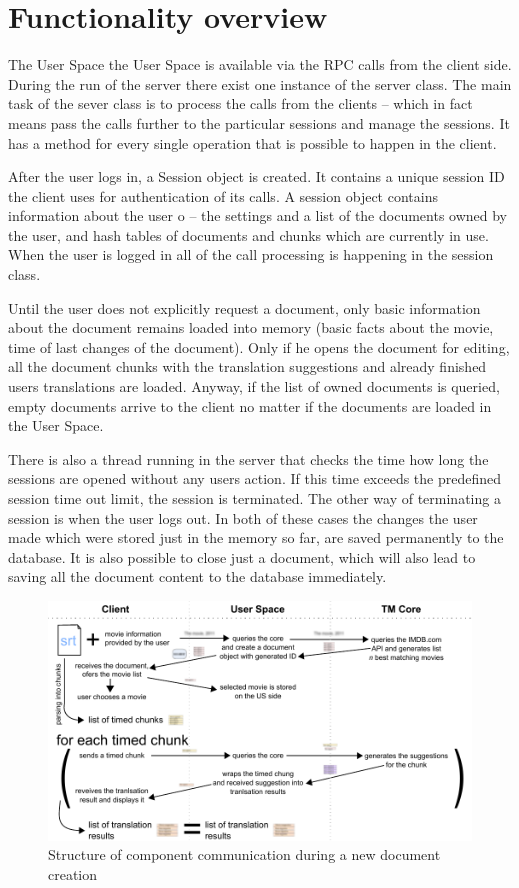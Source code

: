 \section{Functionality overview}

The User Space the User Space is available via the RPC calls from the client side. During the run of the server there exist one instance of the server class. The main task of the sever class is to process the calls from the clients -- which in fact means pass the calls further to the particular sessions and manage the sessions. It has a method for every single operation that is possible to happen in the client.

After the user logs in, a Session object is created. It contains a unique session ID the client uses for authentication of its calls. A session object contains information about the user o -- the settings and a list of the documents owned by the user, and hash tables of documents and chunks which are currently in use. When the user is logged in all of the call processing is happening in the session class.

Until the user does not explicitly request a document, only basic information about the document remains loaded into memory (basic facts about the movie, time of last changes of the document). Only if he opens the document for editing, all the document chunks with the translation suggestions and already finished users translations are loaded. Anyway, if the list of owned documents is queried, empty documents arrive to the client no matter if the documents are loaded in the User Space.

There is also a thread running in the server that checks the time how long the sessions are opened without any users action. If this time exceeds the predefined session time out limit, the session is terminated. The other way of terminating a session is when the user logs out. In both of these cases the changes the user made which were stored just in the memory so far, are saved permanently to the database. It is also possible to close just a document, which will also lead to saving all the document content to the database immediately.

\begin{figure}
\begin{center}
\includegraphics{figures/creating_document.pdf}
\end{center}
\caption{Structure of component communication during a new document creation}
\end{figure}

